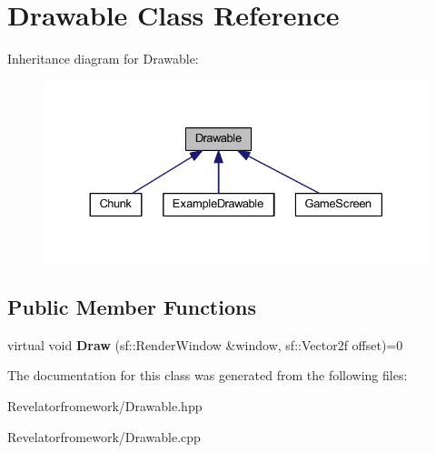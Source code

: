 \hypertarget{class_drawable}{\section{Drawable Class Reference}
\label{class_drawable}
}


Inheritance diagram for Drawable\-:\nopagebreak
\begin{figure}[H]
\begin{center}
\leavevmode
\includegraphics[width=330pt]{class_drawable__inherit__graph}
\end{center}
\end{figure}
\subsection*{Public Member Functions}
\begin{DoxyCompactItemize}
\item 
\hypertarget{class_drawable_a0e24de52eeb44555872c70f3adf854d2}{virtual void {\bfseries Draw} (sf\-::\-Render\-Window \&window, sf\-::\-Vector2f offset)=0}\label{class_drawable_a0e24de52eeb44555872c70f3adf854d2}

\end{DoxyCompactItemize}


The documentation for this class was generated from the following files\-:\begin{DoxyCompactItemize}
\item 
Revelatorfromework/Drawable.\-hpp\item 
Revelatorfromework/Drawable.\-cpp\end{DoxyCompactItemize}
